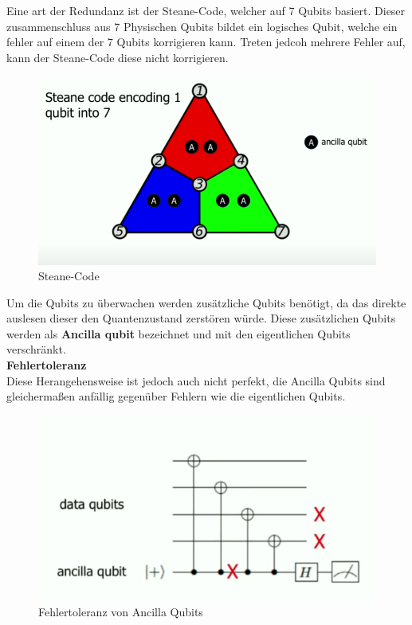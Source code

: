 Eine art der Redundanz ist der Steane-Code, welcher auf 7 Qubits basiert. Dieser zusammenschluss aus 7 Physischen Qubits bildet ein logisches Qubit,
welche ein fehler auf einem der 7 Qubits korrigieren kann. Treten jedcoh mehrere Fehler auf, kann der Steane-Code diese nicht korrigieren.\\

\begin{figure}[H]
    \centering
    \includegraphics[width=0.75\linewidth]{img/Steane.png}
    \caption{Steane-Code}
    \label{fig:Steane}
\end{figure}

Um die Qubits zu überwachen werden zusätzliche Qubits benötigt, da das direkte auslesen dieser den Quantenzustand zerstören würde.
Diese zusätzlichen Qubits werden als \textbf{Ancilla qubit} bezeichnet und mit den eigentlichen Qubits verschränkt.\\

\textbf{Fehlertoleranz}\\
Diese Herangehensweise ist jedoch auch nicht perfekt, die Ancilla Qubits sind gleichermaßen anfällig gegenüber Fehlern wie die eigentlichen Qubits.\\

\begin{figure}[H]
    \centering
    \includegraphics[width=0.75\linewidth]{img/Fehlertoleranz.png}
    \caption{Fehlertoleranz von Ancilla Qubits}
    \label{fig:Fehlertoleranz}
\end{figure}


